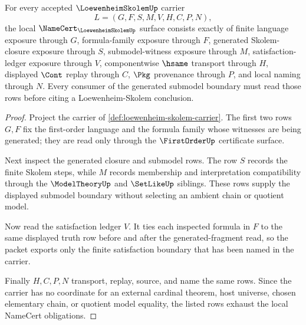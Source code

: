 \begin{theorem}
\label{thm:loewenheim-skolem-namecert-obligations}
For every accepted $\LoewenheimSkolemUp$ carrier
$$
L=(G,F,S,M,V,H,C,P,N),
$$
the local $\NameCert_{\LoewenheimSkolemUp}$ surface consists exactly of finite language exposure through $G$, formula-family exposure through $F$, generated Skolem-closure exposure through $S$, submodel-witness exposure through $M$, satisfaction-ledger exposure through $V$, componentwise $\hsame$ transport through $H$, displayed $\Cont$ replay through $C$, $\Pkg$ provenance through $P$, and local naming through $N$. Every consumer of the generated submodel boundary must read those rows before citing a Loewenheim-Skolem conclusion.
\end{theorem}
\begin{proof}
Project the carrier of \autoref{def:loewenheim-skolem-carrier}. The first two rows $G,F$ fix the first-order language and the formula family whose witnesses are being generated; they are read only through the $\FirstOrderUp$ certificate surface.

Next inspect the generated closure and submodel rows. The row $S$ records the finite Skolem steps, while $M$ records membership and interpretation compatibility through the $\ModelTheoryUp$ and $\SetLikeUp$ siblings. These rows supply the displayed submodel boundary without selecting an ambient chain or quotient model.

Now read the satisfaction ledger $V$. It ties each inspected formula in $F$ to the same displayed truth row before and after the generated-fragment read, so the packet exports only the finite satisfaction boundary that has been named in the carrier.

Finally $H,C,P,N$ transport, replay, source, and name the same rows. Since the carrier has no coordinate for an external cardinal theorem, host universe, chosen elementary chain, or quotient model equality, the listed rows exhaust the local NameCert obligations.
\end{proof}



